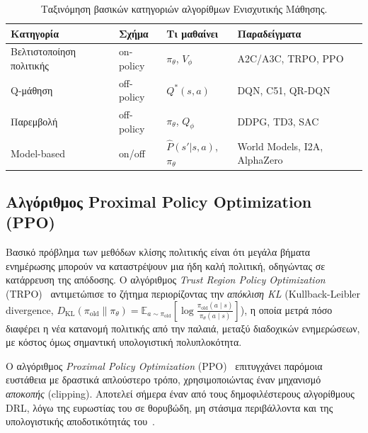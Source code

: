 \begin{table}[ht]
    \centering
    \caption{Ταξινόμηση βασικών κατηγοριών αλγορίθμων Ενισχυτικής Μάθησης.}
    \label{tab:rl-taxonomy}
    \begin{tabular}{@{}lllp{4.2cm}@{}}
        \toprule
        \textbf{Κατηγορία} & \textbf{Σχήμα} & \textbf{Τι μαθαίνει} &
        \textbf{Παραδείγματα} \\
        \midrule
        Βελτιστοποίηση πολιτικής & on-policy  & $\pi_\theta$, $V_\phi$ &
            A2C/A3C, TRPO, PPO \\
        Q-μάθηση                 & off-policy & $Q^{*}(s,a)$         &
            DQN, C51, QR-DQN \\
        Παρεμβολή                & off-policy & $\pi_\theta$, $Q_\phi$ &
            DDPG, TD3, SAC \\
        Model-based              & on/off     & $\hat{P}(s'|s,a)$, $\pi_\theta$ &
            World Models, I2A, AlphaZero \\
        \bottomrule
    \end{tabular}
\end{table}


\subsection{Αλγόριθμος Proximal Policy Optimization (PPO)}
\label{subsec:ppo}

Βασικό πρόβλημα των μεθόδων κλίσης πολιτικής είναι ότι μεγάλα βήματα
ενημέρωσης μπορούν να καταστρέψουν μια ήδη καλή πολιτική, οδηγώντας σε
κατάρρευση της απόδοσης. Ο αλγόριθμος \emph{Trust Region Policy Optimization}
(TRPO)~\cite{schulman2015trpo} αντιμετώπισε το ζήτημα περιορίζοντας την
\emph{απόκλιση KL} (Kullback-Leibler divergence,
$D_{\mathrm{KL}}(\pi_{\mathrm{old}} \| \pi_\theta) = \mathbb{E}_{a \sim
\pi_{\mathrm{old}}}\!\left[\log \frac{\pi_{\mathrm{old}}(a \mid s)}{\pi_\theta(a
\mid s)}\right]$), η οποία μετρά πόσο διαφέρει η νέα κατανομή πολιτικής από
την παλαιά, μεταξύ διαδοχικών ενημερώσεων, με κόστος όμως σημαντική
υπολογιστική πολυπλοκότητα.

Ο αλγόριθμος \emph{Proximal Policy Optimization}
(PPO)~\cite{schulman2017ppo} επιτυγχάνει παρόμοια ευστάθεια με δραστικά
απλούστερο τρόπο, χρησιμοποιώντας έναν μηχανισμό \emph{αποκοπής} (clipping).
Αποτελεί σήμερα έναν από τους δημοφιλέστερους αλγορίθμους DRL, λόγω της
ευρωστίας του σε θορυβώδη, μη στάσιμα περιβάλλοντα και της υπολογιστικής
αποδοτικότητάς του~\cite{arulkumaran2017drlsurvey}.

